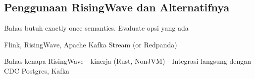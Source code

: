 \subsection{Penggunaan RisingWave dan Alternatifnya}

Bahas butuh exactly once semantics. Evaluate opsi yang ada

Flink, RisingWave, Apache Kafka Stream (or Redpanda)

Bahas kenapa RisingWave
- kinerja (Rust, NonJVM)
- Integrasi langsung dengan CDC Postgres, Kafka